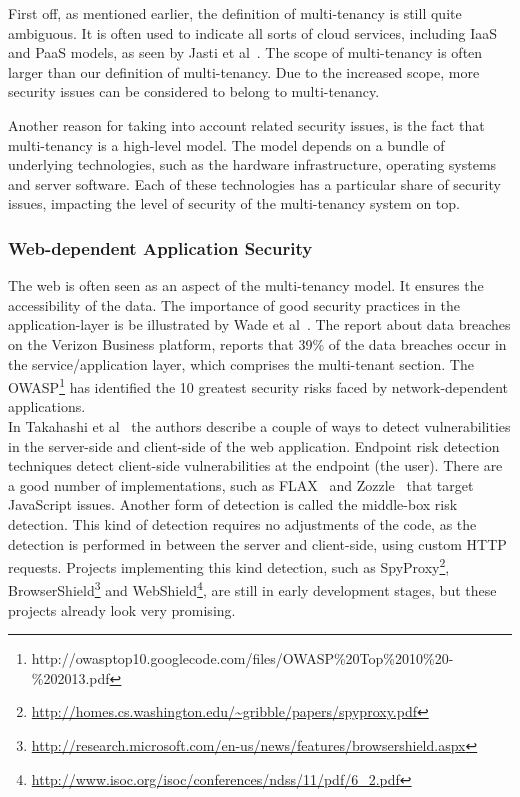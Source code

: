 First off, as mentioned earlier, the definition of multi-tenancy is still quite ambiguous. 
It is often used to indicate all sorts of cloud services, including IaaS and PaaS models, as seen by Jasti et al~\cite{Jasti2010Security}. 
The scope of multi-tenancy is often larger than our definition of multi-tenancy. Due to the increased scope, more security issues can be considered to belong to multi-tenancy.

Another reason for taking into account related security issues, is the fact that multi-tenancy is a high-level model. 
The model depends on a bundle of underlying technologies, such as the hardware infrastructure, operating systems and server software. 
Each of these technologies has a particular share of security issues, impacting the level of security of the multi-tenancy system on top. 


\subsubsection{Web-dependent Application Security}
The web is often seen as an aspect of the multi-tenancy model. 
It ensures the accessibility of the data. 
The importance of good security practices in the application-layer is be illustrated by Wade et al~\cite{Wade2008Security}.
The report about data breaches on the Verizon Business platform, reports that 39\% of the data breaches occur in the service/application layer, which comprises the multi-tenant section. The \ac{OWASP}\footnote{http://owasptop10.googlecode.com/files/OWASP\%20Top\%2010\%20-\%202013.pdf} has identified the 10 greatest security risks faced by network-dependent applications.\\

In Takahashi et al~\cite{Takahashi2012Security} the authors describe a couple of ways to detect vulnerabilities in the server-side and client-side of the web application. 
Endpoint risk detection techniques detect client-side vulnerabilities at the endpoint (the user). 
There are a good number of implementations, such as FLAX~\cite{saxena10kudzu} and Zozzle~\cite{curtsinger2011zozzle} that target JavaScript issues. 
Another form of detection is called the middle-box risk detection. 
This kind of detection requires no adjustments of the code, as the detection is performed in between the server and client-side, using custom HTTP requests. 
Projects implementing this kind detection, such as SpyProxy\footnote{\url{http://homes.cs.washington.edu/~gribble/papers/spyproxy.pdf}}, BrowserShield\footnote{\url{http://research.microsoft.com/en-us/news/features/browsershield.aspx}} and WebShield\footnote{\url{http://www.isoc.org/isoc/conferences/ndss/11/pdf/6_2.pdf}}, are still in early development stages, but these projects already look very promising.

